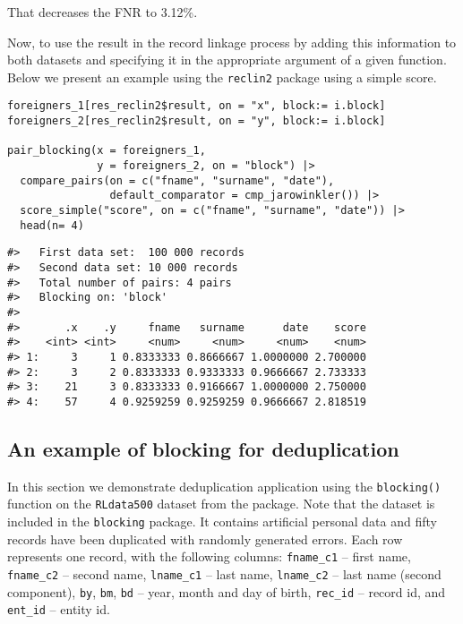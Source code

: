 That decreases the FNR to
3.12\%.

Now, to use the result in the record linkage process by adding this information to both datasets and specifying it in the appropriate argument of a given function.
Below we present an example using the \texttt{reclin2} package using a simple score.

\begin{verbatim}
foreigners_1[res_reclin2$result, on = "x", block:= i.block]
foreigners_2[res_reclin2$result, on = "y", block:= i.block]

pair_blocking(x = foreigners_1, 
              y = foreigners_2, on = "block") |>
  compare_pairs(on = c("fname", "surname", "date"),
                default_comparator = cmp_jarowinkler()) |>
  score_simple("score", on = c("fname", "surname", "date")) |>
  head(n= 4)
\end{verbatim}

\begin{verbatim}
#>   First data set:  100 000 records
#>   Second data set: 10 000 records
#>   Total number of pairs: 4 pairs
#>   Blocking on: 'block'
#> 
#>       .x    .y     fname   surname      date    score
#>    <int> <int>     <num>     <num>     <num>    <num>
#> 1:     3     1 0.8333333 0.8666667 1.0000000 2.700000
#> 2:     3     2 0.8333333 0.9333333 0.9666667 2.733333
#> 3:    21     3 0.8333333 0.9166667 1.0000000 2.750000
#> 4:    57     4 0.9259259 0.9259259 0.9666667 2.818519
\end{verbatim}

\subsection{An example of blocking for deduplication}\label{an-example-of-blocking-for-deduplication}

In this section we demonstrate deduplication application using the \texttt{blocking()} function on the
\texttt{RLdata500} dataset from the  package. Note that
the dataset is included in the \texttt{blocking} package. It contains
artificial personal data and fifty records have been duplicated with
randomly generated errors. Each row represents one record, with the
following columns: \texttt{fname\_c1} -- first name, \texttt{fname\_c2} -- second name,
\texttt{lname\_c1} -- last name, \texttt{lname\_c2} -- last name (second component),
\texttt{by}, \texttt{bm}, \texttt{bd} -- year, month and day of birth, \texttt{rec\_id} -- record id, and
\texttt{ent\_id} -- entity id.

